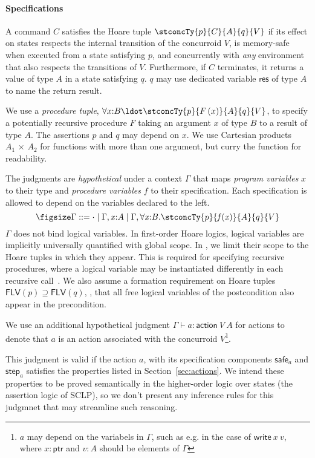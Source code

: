 \paragraph{Specifications}

A command $C$ satisfies the Hoare tuple $\stconcTy{p}{C}{A}{q}{V}$ if
its effect on states respects the internal transition of the
concurroid $V$, is memory-safe when executed from a state satisfying
$p$, and concurrently with {\em any} environment that also respects
the transitions of $V$. Furthermore, if $C$ terminates, it returns a
value of type $A$ in a state satisfying $q$. $q$ may use dedicated
variable $\mathsf{res}$ of type $A$ to name the return result.

We use a {\em procedure tuple},
$\forall{x}{:}{B}\ldot\stconcTy{p}{F\,(x)}{A}{q}{V}$, to specify a
potentially recursive procedure $F$ taking an argument $x$ of type $B$
to a result of type $A$. The assertions $p$ and $q$ may depend on
$x$. We use Cartesian products $A_1\,{\times}\,A_2$ for functions with
more than one argument, but curry the function for readability.

The \SCSL judgments are {\em hypothetical} under a context $\Gamma$
that maps \emph{program variables} $x$ to their type and
\emph{procedure variables} $f$ to their specification. Each
specification is allowed to depend on the variables declared to the
left.  
%
\[
\figsize
\Gamma ::= \cdot\mid  \Gamma, \mathit{x}{:}A \mid \Gamma,\forall \mathit{x}{:} B. \stconcTy{p}{\mathit{f} (\mathit{x})}{A}{q}{V}
\]
%
$\Gamma$ does not bind logical variables. In first-order Hoare logics,
logical variables are implicitly universally quantified with global
scope. In \SCSL, we limit their scope to the Hoare tuples in which
they appear.  This is required for specifying recursive procedures,
where a logical variable may be instantiated differently in each
recursive call~\cite{Kleymann:FAC99}.  We also assume a formation
requirement on Hoare tuples $\mathsf{FLV}(p) \supseteq
\mathsf{FLV}(q)$, \ie, that all free logical variables of the
postcondition also appear in the precondition.

We use an additional hypothetical judgment $\Gamma \vdash a :
\mathsf{action}\ V\ A$ for actions to denote that $a$ is an action
associated with the concurroid $V$\footnote{$a$ may depend on the
  variabels in $\Gamma$, such as e.g. in the case of
  $\mathsf{write}\ x\ v$, where $x{:}\mathsf{ptr}$ and $v{:}A$ should
  be elements of $\Gamma$}. 

This judgment is valid if the action $a$, with its specification
components $\mathsf{safe}_a$ and $\mathsf{step}_a$ satisfies the
properties listed in Section~\ref{sec:actions}. We intend these
properties to be proved semantically in the higher-order logic over
states (the assertion logic of SCLP), so we don't present any
inference rules for this judgmnet that may streamline such reasoning.

